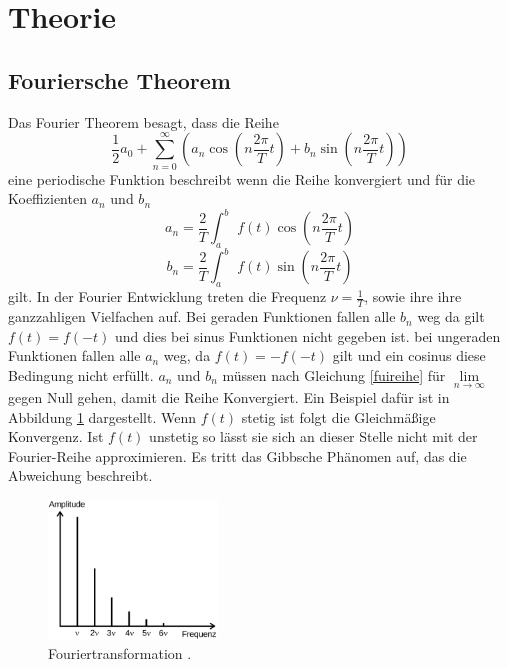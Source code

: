 \section{Theorie}
\label{sec:Theorie}
\subsection{Fouriersche Theorem}
Das Fourier Theorem besagt, dass die Reihe
\begin{equation}
\frac{1}{2}a_0+\sum_{n=0}^\infty\left(a_n \cos(n\frac{2\pi}{T}t)+b_n\sin(n\frac{2\pi}{T}t)\right)
\label{fuireihe}
\end{equation}
eine periodische Funktion beschreibt wenn die Reihe konvergiert und für die
Koeffizienten $a_n$ und $b_n$
\begin{equation}
  a_n=\frac{2}{T}\int_a^b\,\,f(t)\cos(n\frac{2\pi}{T}t)
  \label{fuikoeffizient_a}
\end{equation}
\begin{equation}
  b_n=\frac{2}{T}\int_a^b\,\,f(t)\sin(n\frac{2\pi}{T}t)
  \label{fuikoeffizient_b}
\end{equation}
gilt. In der Fourier Entwicklung treten die Frequenz $\nu=\frac{1}{T}$, sowie ihre
ihre ganzzahligen Vielfachen auf. Bei geraden Funktionen fallen alle $b_n$ weg
da gilt $f(t)=f(-t)$ und dies bei sinus Funktionen nicht gegeben ist. bei
ungeraden Funktionen fallen alle $a_n$ weg, da $f(t)=-f(-t)$ gilt und ein cosinus
diese Bedingung nicht erfüllt. $a_n$ und $b_n$ müssen nach Gleichung
\eqref{fuireihe} für $\lim\limits_{n \to \infty}$ gegen Null gehen, damit die
Reihe Konvergiert. Ein Beispiel dafür ist in Abbildung \ref{fig:Fouriertrafo}
dargestellt. Wenn $f(t)$ stetig ist folgt die Gleichmäßige Konvergenz. Ist $f(t)$
unstetig so lässt sie sich an dieser Stelle nicht mit der Fourier-Reihe
approximieren. Es tritt das Gibbsche Phänomen auf, das die Abweichung beschreibt.
\begin{figure}
  \centering
  \includegraphics[width=0.4\textwidth]{Fouriertrafo.png}
  \caption{Fouriertransformation \cite{sample}.}
  \label{fig:Fouriertrafo}
\end{figure}
